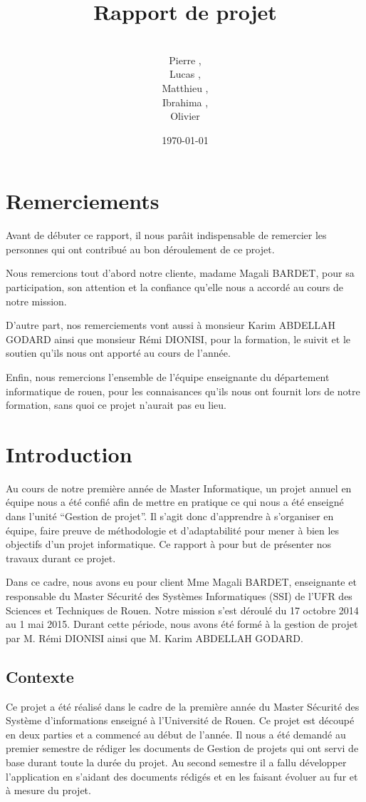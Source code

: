 \documentclass{../res/univ-projet}
\title{Rapport de projet}
\author{\\ Pierre \bsc{Balmelle},\\ Lucas \bsc{Barbay}, \\ Matthieu \bsc{Fin},\\ Ibrahima \bsc{Sorry Barry},\\ Olivier \bsc{Thibault}}
\date{\today}
\begin{document}
\maketitle
\newpage
\section{Remerciements}
Avant de débuter ce rapport, il nous parâit indispensable de remercier les personnes qui ont contribué au bon déroulement de ce projet.

Nous remercions tout d'abord notre cliente, madame Magali BARDET, pour sa participation, son attention et la confiance qu'elle nous a accordé au 
cours de notre mission.

D'autre part, nos remerciements vont aussi à monsieur Karim ABDELLAH GODARD ainsi que monsieur Rémi DIONISI, pour la formation, le suivit et le soutien qu'ils nous ont apporté 
au cours de l'année.

Enfin, nous remercions l'ensemble de l'équipe enseignante du département informatique de rouen, pour les connaisances qu'ils nous ont fournit lors de notre formation,
sans quoi ce projet n'aurait pas eu lieu.
\newpage
\tableofcontents

\newpage

\section{Introduction}

Au cours de notre première année de Master Informatique, un projet annuel en équipe nous a été confié afin de mettre en pratique ce qui nous a 
été enseigné dans l'unité ``Gestion de projet''. Il s'agit donc d'apprendre à s'organiser en équipe, faire preuve de méthodologie et d'adaptabilité pour mener 
à bien les objectifs d'un projet informatique. Ce rapport à pour but de présenter nos travaux durant ce projet.

Dans ce cadre, nous avons eu pour client Mme Magali BARDET, enseignante et responsable du Master Sécurité des Systèmes Informatiques (SSI) de l'UFR des Sciences et Techniques
de Rouen. Notre mission s'est déroulé du 17 octobre 2014 au 1 mai 2015. Durant cette période, nous avons été formé à la gestion de projet par M. Rémi DIONISI ainsi 
que M. Karim ABDELLAH GODARD.



  \subsection{Contexte}
  Ce projet a été réalisé dans le cadre de la première année du Master Sécurité des Système d'informations enseigné à  l'Université de Rouen. Ce projet est découpé en deux parties et a commencé au début de l'année. Il nous a été demandé au premier semestre de rédiger les documents de Gestion de projets qui ont servi de base durant toute la durée du projet. Au second semestre il a fallu développer l'application en s'aidant des documents rédigés et en les faisant évoluer au fur et à mesure du projet.
\end{document}
